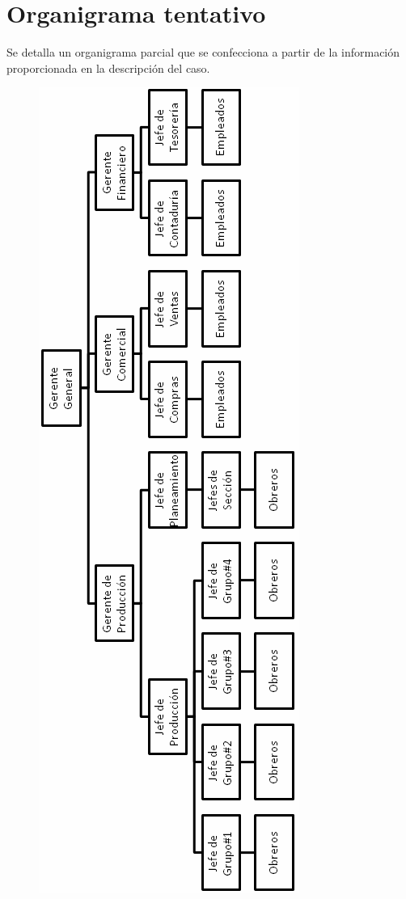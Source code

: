 \documentclass[12pt,a4paper,spanish]{article}
\begin{document}
\newpage
\section{Organigrama tentativo}
Se detalla un organigrama parcial que se confecciona a partir de la informaci\'on proporcionada en la descripci\'on del caso.

\begin{figure}[H]
\centering
\includegraphics[scale=0.75]{organigrama.png}
\end{figure}
\end{document}
